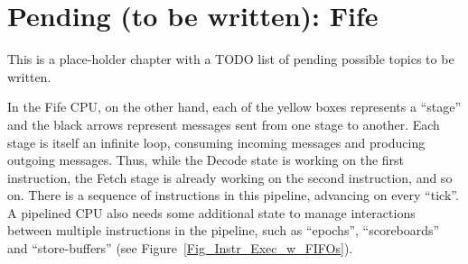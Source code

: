 

\chapter{Pending (to be written): Fife}


\setcounter{page}{1}
\renewcommand{\thepage}{\arabic{chapter}-\arabic{page}}

\label{ch_Fife_Pending}


This is a place-holder chapter with a TODO list of pending possible
topics to be written.

In the Fife CPU, on the other hand, each of the yellow boxes
represents a ``stage'' and the black arrows represent messages sent
from one stage to another.  Each stage is itself an infinite loop,
consuming incoming messages and producing outgoing messages.  Thus,
while the Decode state is working on the first instruction, the Fetch
stage is already working on the second instruction, and so on.  There
is a sequence of instructions in this pipeline, advancing on every
``tick''.  A pipelined CPU also needs some additional state to manage
interactions between multiple instructions in the pipeline, such as
``epochs'', ``scoreboards'' and ``store-buffers'' (see
Figure~\ref{Fig_Instr_Exec_w_FIFOs}).


